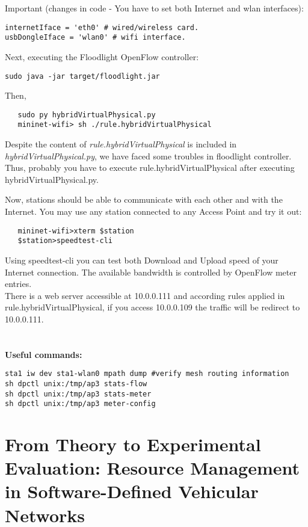 Important (changes in code - You have to set both Internet and wlan interfaces):
\begin{verbatim}
internetIface = 'eth0' # wired/wireless card.
usbDongleIface = 'wlan0' # wifi interface.
\end{verbatim}

\noindent Next, executing the Floodlight OpenFlow controller: 
\begin{verbatim}
sudo java -jar target/floodlight.jar
\end{verbatim}

\noindent Then,
\begin{verbatim}
   sudo py hybridVirtualPhysical.py
   mininet-wifi> sh ./rule.hybridVirtualPhysical
\end{verbatim}

Despite the content of \textit{rule.hybridVirtualPhysical} is included in \textit{hybridVirtualPhysical.py}, we have faced some troubles in floodlight controller. Thus, probably you have to execute rule.hybridVirtualPhysical after executing hybridVirtualPhysical.py.

Now, stations should be able to communicate with each other and with the Internet. You may use any station connected to any Access Point and try it out:
\begin{verbatim}
   mininet-wifi>xterm $station 
   $station>speedtest-cli
\end{verbatim}
Using speedtest-cli you can test both Download and Upload speed of your Internet connection. The available bandwidth is controlled by OpenFlow meter entries.\\

\noindent There is a web server accessible at 10.0.0.111 and according rules applied in rule.hybridVirtualPhysical, if you access 10.0.0.109 the traffic will be redirect to 10.0.0.111.\\
\\
\\
\textbf{Useful commands:}
\begin{verbatim}
sta1 iw dev sta1-wlan0 mpath dump #verify mesh routing information
sh dpctl unix:/tmp/ap3 stats-flow
sh dpctl unix:/tmp/ap3 stats-meter
sh dpctl unix:/tmp/ap3 meter-config
\end{verbatim}

\section{From Theory to Experimental Evaluation: Resource Management in Software-Defined Vehicular Networks}

